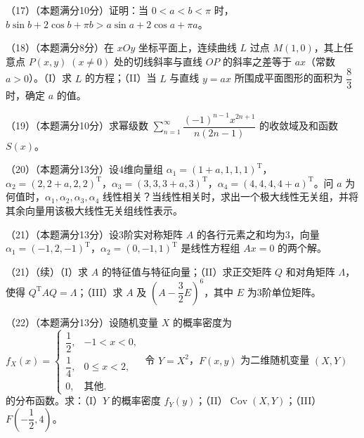 \documentclass[UTF8,12pt]{ctexart}
\begin{document}
（17）（本题满分10分）证明：当 \(\displaystyle 0<a<b<\pi\) 时，\(\displaystyle b\sin b+2\cos b+\pi b>a\sin a+2\cos a+\pi a\)。


（18）（本题满分8分）在 \(\displaystyle xOy\) 坐标平面上，连续曲线 \(\displaystyle L\) 过点 \(\displaystyle M(1,\allowbreak 0)\)，其上任意点 \(\displaystyle P(x,\allowbreak y)\;(x\ne0)\) 处的切线斜率与直线 \(\displaystyle OP\) 的斜率之差等于 \(\displaystyle ax\)（常数 \(\displaystyle a>0\)）。（I）求 \(\displaystyle L\) 的方程；（II）当 \(\displaystyle L\) 与直线 \(\displaystyle y=ax\) 所围成平面图形的面积为 \(\displaystyle \dfrac{\displaystyle 8}{\displaystyle 3}\) 时，确定 \(\displaystyle a\) 的值。


（19）（本题满分10分）求幂级数 \(\displaystyle \sum_{n=1}^{\infty}\dfrac{\displaystyle (-1)^{n-1}x^{2n+1}}{\displaystyle n(2n-1)}\) 的收敛域及和函数 \(\displaystyle S(x)\)。


（20）（本题满分13分）设4维向量组 \(\displaystyle \alpha_1=(1+a,\allowbreak 1,\allowbreak 1,\allowbreak 1)^{\mathrm T}\)，\(\displaystyle \alpha_2=(2,\allowbreak 2+a,\allowbreak 2,\allowbreak 2)^{\mathrm T}\)，\(\displaystyle \alpha_3=(3,\allowbreak 3,\allowbreak 3+a,\allowbreak 3)^{\mathrm T}\)，\(\displaystyle \alpha_4=(4,\allowbreak 4,\allowbreak 4,\allowbreak 4+a)^{\mathrm T}\)。问 \(\displaystyle a\) 为何值时，\(\displaystyle \alpha_1,\allowbreak \alpha_2,\allowbreak \alpha_3,\allowbreak \alpha_4\) 线性相关？当线性相关时，求出一个极大线性无关组，并将其余向量用该极大线性无关组线性表示。


（21）（本题满分13分）设3阶实对称矩阵 \(\displaystyle A\) 的各行元素之和均为3，向量 \(\displaystyle \alpha_1=(-1,\allowbreak 2,\allowbreak -1)^{\mathrm T}\)，\(\displaystyle \alpha_2=(0,\allowbreak -1,\allowbreak 1)^{\mathrm T}\) 是线性方程组 \(\displaystyle Ax=0\) 的两个解。


（21）（续）（I）求 \(\displaystyle A\) 的特征值与特征向量；（II）求正交矩阵 \(\displaystyle Q\) 和对角矩阵 \(\displaystyle \Lambda\)，使得 \(\displaystyle Q^{\mathrm T}AQ=\Lambda\)；（III）求 \(\displaystyle A\) 及 \(\displaystyle (A-\dfrac{\displaystyle 3}{\displaystyle 2}E)^6\)，其中 \(\displaystyle E\) 为3阶单位矩阵。


（22）（本题满分13分）设随机变量 \(\displaystyle X\) 的概率密度为 \(\displaystyle f_X(x)=\begin{cases}\dfrac{\displaystyle 1}{\displaystyle 2},\allowbreak &-1<x<0,\allowbreak \\\dfrac{\displaystyle 1}{\displaystyle 4},\allowbreak &0\le x<2,\allowbreak \\0,\allowbreak &\text{其他}.\end{cases}\) 令 \(\displaystyle Y=X^2\)，\(\displaystyle F(x,\allowbreak y)\) 为二维随机变量 \(\displaystyle (X,\allowbreak Y)\) 的分布函数。求：（I）\(\displaystyle Y\) 的概率密度 \(\displaystyle f_Y(y)\)；（II）\(\displaystyle \operatorname{Cov}(X,\allowbreak Y)\)；（III）\(\displaystyle F(-\dfrac{\displaystyle 1}{\displaystyle 2},\allowbreak 4)\)。
\end{document}
